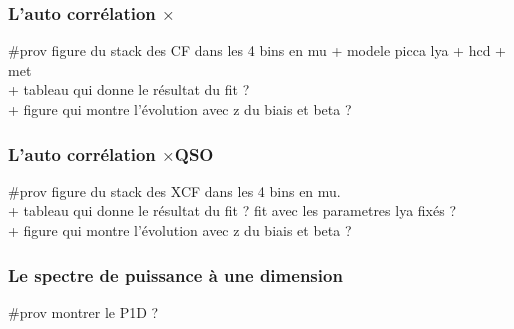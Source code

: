 \documentclass[11pt, twoside, a4paper, openright]{report}
\begin{document}
\subsubsection{L'auto corrélation \lya{}$\times$\lya{}}
\#prov figure du stack des CF dans les 4 bins en mu + modele picca lya + hcd + met \\
+ tableau qui donne le résultat du fit ? \\
+ figure qui montre l'évolution avec z du biais et beta ?


\subsubsection{L'auto corrélation \lya{}$\times$QSO}
\#prov figure du stack des XCF dans les 4 bins en mu. \\
+ tableau qui donne le résultat du fit ? fit avec les parametres lya fixés ?\\ 
+ figure qui montre l'évolution avec z du biais et beta ? 


\subsubsection{Le spectre de puissance à une dimension}
\#prov montrer le P1D ?





\end{document}
